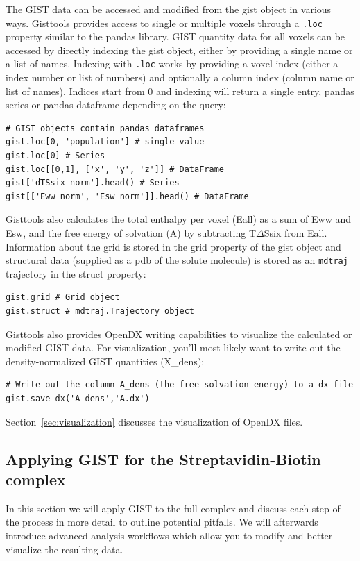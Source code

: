 \documentclass[9pt,tutorial]{livecoms}
\newcommand{\software}{\texttt}
\newcommand{\code}{\texttt}
\begin{document}
The GIST data can be accessed and modified from the gist object in various ways.
Gisttools provides access to single or multiple voxels through a \code{.loc} property similar to the pandas library. 
GIST quantity data for all voxels can be accessed by directly indexing the gist object, either by providing a single name or a list of names.
Indexing with \code{.loc} works by providing a voxel index (either a index number or list of numbers) and optionally a column index (column name or list of names). Indices start from 0 and indexing will return a single entry, pandas series or pandas dataframe depending on the query:
\begin{lstlisting}[style=python]
# GIST objects contain pandas dataframes
gist.loc[0, 'population'] # single value
gist.loc[0] # Series
gist.loc[[0,1], ['x', 'y', 'z']] # DataFrame
gist['dTSsix_norm'].head() # Series
gist[['Eww_norm', 'Esw_norm']].head() # DataFrame
\end{lstlisting}
Gisttools also calculates the total enthalpy per voxel (Eall) as a sum of Eww and Esw, and the free energy of solvation (A) by subtracting T$\Delta$Ssix from Eall.\\
Information about the grid is stored in the grid property of the gist object and structural data (supplied as a pdb of the solute molecule) is stored as an \software{mdtraj} trajectory in the struct property:
\begin{lstlisting}[style=python]
gist.grid # Grid object
gist.struct # mdtraj.Trajectory object
\end{lstlisting}
Gisttools also provides OpenDX writing capabilities to visualize the calculated or modified GIST data. For visualization, you'll most likely want to write out the density-normalized GIST quantities (X\_dens):

\begin{lstlisting}[style=python]
# Write out the column A_dens (the free solvation energy) to a dx file
gist.save_dx('A_dens','A.dx')
\end{lstlisting}
Section~\ref{sec:visualization} discusses the visualization of OpenDX files.

\subsection{Applying GIST for the Streptavidin-Biotin complex}
\label{subsec:gist_complex}
In this section we will apply GIST to the full complex and discuss each step of the process in more detail to outline potential pitfalls. We will afterwards introduce advanced analysis workflows which allow you to modify and better visualize the resulting data.
\end{document}
